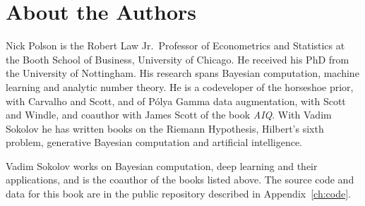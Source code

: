 \chapter{About the Authors}

Nick Polson is the Robert Law Jr.\ Professor of Econometrics and Statistics at the Booth School of Business, University of Chicago. He received his PhD from the University of Nottingham. His research spans Bayesian computation, machine learning and analytic number theory. He is a codeveloper of the horseshoe prior, with Carvalho and Scott, and of P\'olya Gamma data augmentation, with Scott and Windle, and coauthor with James Scott of the book \emph{AIQ}. With Vadim Sokolov he has written books on the Riemann Hypothesis, Hilbert's sixth problem, generative Bayesian computation and artificial intelligence.

Vadim Sokolov works on Bayesian computation, deep learning and their applications, and is the coauthor of the books listed above. The source code and data for this book are in the public repository described in Appendix~\ref{ch:code}.
